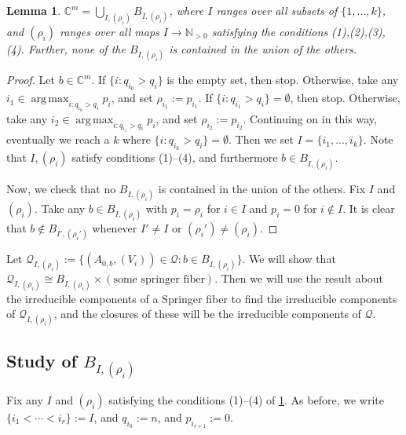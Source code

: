 \documentclass[12pt,psamsfonts]{article}
\DeclareMathOperator*{\argmax}{arg\,max}
\newtheorem{lemma}[theorem]{Lemma}
\begin{document}
\begin{lemma}\label{bs_union}
    \(\mathbb{C}^m = \bigcup_{I, (\rho_i)} B_{I, (\rho_i)}\), where \(I\) ranges over all subsets of \(\{1, ..., k\}\), and \((\rho_i)\) ranges over all maps \(I \to \mathbb{N}_{>0}\) satisfying the conditions (1),(2),(3),(4).
    Further, none of the \(B_{I, (\rho_i)}\) is contained in the union of the others.
\end{lemma}
\begin{proof}
    Let \(b \in \mathbb{C}^m\).
    If \(\{i : q_{i_0} > q_i\}\) is the empty set, then stop.
    Otherwise, take any \(i_1 \in \argmax_{i : q_{i_0} > q_i} p_i\), and set \(\rho_{i_1} := p_{i_1}\).
    If \(\{i : q_{i_1} > q_i\} = \emptyset\), then stop.
    Otherwise, take any \(i_2 \in \argmax_{i : q_{i_1} > q_i} p_i\), and set \(\rho_{i_2} := p_{i_2}\).
    Continuing on in this way, eventually we reach a \(k\) where \(\{i : q_{i_k} > q_i\} = \emptyset\).
    Then we set \(I = \{i_1, ..., i_k\}\).
    Note that \(I, (\rho_i)\) satisfy conditions (1)--(4), and furthermore \(b \in B_{I, (\rho_i)}\).
    \par Now, we check that no \(B_{I, (\rho_i)}\) is contained in the union of the others.
    Fix \(I\) and \((\rho_i)\).
    Take any \(b \in B_{I, (\rho_i)}\) with \(p_i = \rho_i\) for \(i \in I\) and \(p_i = 0\) for \(i \notin I\).
    It is clear that \(b \notin B_{I', (\rho_i')}\) whenever \(I' \neq I\) or \((\rho_i') \neq (\rho_i)\).
\end{proof}
\par Let \(\mathcal{Q}_{I, (\rho_i)} := \{(A_{0, b}, (V_i)) \in \mathcal{Q} : b \in B_{I, (\rho_i)}\}\).
We will show that \(\mathcal{Q}_{I, (\rho_i)} \cong B_{I, (\rho_i)} \times (\textrm{some springer fiber})\).
Then we will use the result about the irreducible components of a Springer fiber to find the irreducible components of \(\mathcal{Q}_{I, (\rho_i)}\), and the closures of these will be the irreducible components of \(\mathcal{Q}\).

\subsection{Study of \texorpdfstring{\(B_{I, (\rho_i)}\)}{B\_\{I, (p\_i)\}}}
Fix any \(I\) and \((\rho_i)\) satisfying the conditions (1)--(4) of \cref{bs_union}.
As before, we write \(\{i_1 < \cdots < i_r\} := I\), and \(q_{i_0} := n\), and \(p_{i_{r + 1}} := 0\).
\end{document}
